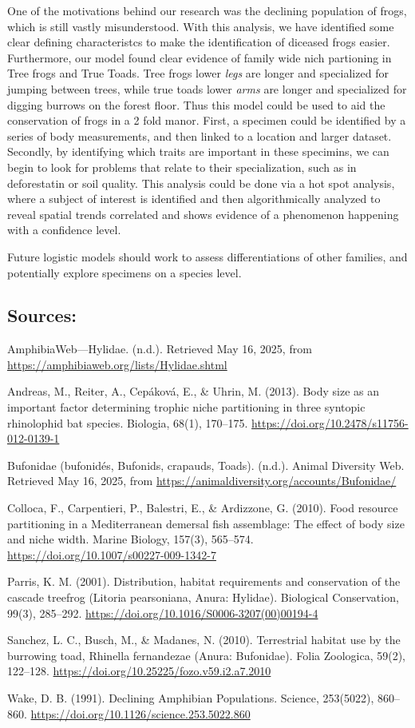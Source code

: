\documentclass[
]{article}
\begin{document}
One of the motivations behind our research was the declining population
of frogs, which is still vastly misunderstood. With this analysis, we
have identified some clear defining characteristcs to make the
identification of diceased frogs easier. Furthermore, our model found
clear evidence of family wide nich partioning in Tree frogs and True
Toads. Tree frogs lower \emph{legs} are longer and specialized for
jumping between trees, while true toads lower \emph{arms} are longer and
specialized for digging burrows on the forest floor. Thus this model
could be used to aid the conservation of frogs in a 2 fold manor. First,
a specimen could be identified by a series of body measurements, and
then linked to a location and larger dataset. Secondly, by identifying
which traits are important in these specimins, we can begin to look for
problems that relate to their specialization, such as in deforestatin or
soil quality. This analysis could be done via a hot spot analysis, where
a subject of interest is identified and then algorithmically analyzed to
reveal spatial trends correlated and shows evidence of a phenomenon
happening with a confidence level.

Future logistic models should work to assess differentiations of other
families, and potentially explore specimens on a species level.

\subsection{Sources:}\label{sources}

AmphibiaWeb---Hylidae. (n.d.). Retrieved May 16, 2025, from
\url{https://amphibiaweb.org/lists/Hylidae.shtml}

Andreas, M., Reiter, A., Cepáková, E., \& Uhrin, M. (2013). Body size as
an important factor determining trophic niche partitioning in three
syntopic rhinolophid bat species. Biologia, 68(1), 170--175.
\url{https://doi.org/10.2478/s11756-012-0139-1}

Bufonidae (bufonidés, Bufonids, crapauds, Toads). (n.d.). Animal
Diversity Web. Retrieved May 16, 2025, from
\url{https://animaldiversity.org/accounts/Bufonidae/}

Colloca, F., Carpentieri, P., Balestri, E., \& Ardizzone, G. (2010).
Food resource partitioning in a Mediterranean demersal fish assemblage:
The effect of body size and niche width. Marine Biology, 157(3),
565--574. \url{https://doi.org/10.1007/s00227-009-1342-7}

Parris, K. M. (2001). Distribution, habitat requirements and
conservation of the cascade treefrog (Litoria pearsoniana, Anura:
Hylidae). Biological Conservation, 99(3), 285--292.
\url{https://doi.org/10.1016/S0006-3207(00)00194-4}

Sanchez, L. C., Busch, M., \& Madanes, N. (2010). Terrestrial habitat
use by the burrowing toad, Rhinella fernandezae (Anura: Bufonidae).
Folia Zoologica, 59(2), 122--128.
\url{https://doi.org/10.25225/fozo.v59.i2.a7.2010}

Wake, D. B. (1991). Declining Amphibian Populations. Science, 253(5022),
860--860. \url{https://doi.org/10.1126/science.253.5022.860}
\end{document}
